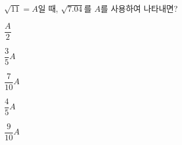 $\sqrt{11}=A$일 때, $\sqrt{7.04}$를 $A$를 사용하여 나타내면?
\begin{choices32}{\rule[-3ex]{0pt}{8ex}$\dfrac{A}{2}$}{\rule[-3ex]{0pt}{8ex}$\dfrac{3}{5}A$}{\rule[-3ex]{0pt}{8ex}$\dfrac{7}{10}A$}{\rule[-3ex]{0pt}{8ex}$\dfrac{4}{5}A$}{\rule[-3ex]{0pt}{8ex}$\dfrac{9}{10}A$}\end{choices32}
